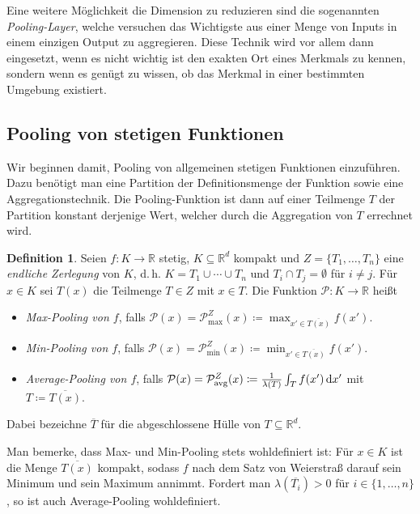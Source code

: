\documentclass[paper=a4, 	%
		fontsize=11pt,
		abstract=true, 	%
		headsepline, 	%
		notitlepage	%
		]{scrartcl}
\theoremstyle{definition}
\newtheorem{definition}[theorem]{Definition}
\newcommand{\R}{\mathbb{R}}
\newcommand{\diff}{\,\textrm{d}}
\newcommand{\avg}{\textnormal{avg}}
\begin{document}
Eine weitere Möglichkeit die Dimension zu reduzieren sind die sogenannten \emph{Pooling-Layer},
welche versuchen das Wichtigste aus einer Menge von Inputs in einem einzigen Output zu aggregieren.
Diese Technik wird vor allem dann eingesetzt, wenn es nicht wichtig ist den exakten Ort eines Merkmals zu kennen, sondern wenn es genügt zu wissen, ob das Merkmal in einer bestimmten Umgebung existiert.


\subsection{Pooling von stetigen Funktionen}

Wir beginnen damit, Pooling von allgemeinen stetigen Funktionen einzuführen.
Dazu benötigt man eine Partition der Definitionsmenge der Funktion sowie eine Aggregationstechnik.
Die Pooling-Funktion ist dann auf einer Teilmenge $T$ der Partition konstant derjenige Wert, welcher durch die Aggregation von $T$ errechnet wird. 

\begin{definition}
    Seien $f: K \rightarrow \R$ stetig, $K\subseteq \R^d$ kompakt und $Z=\{T_1,\dots, T_n\}$ eine \emph{endliche Zerlegung} von $K$, d.\,h. $K = T_1 \cup \cdots \cup T_n$ und $T_i \cap T_j = \emptyset$ für $i \neq j$.
    Für $x\in K$ sei $T(x)$ die Teilmenge $T\in Z$ mit $x\in T$.
    Die Funktion $\mathcal{P}: K\rightarrow \R$ heißt
    \begin{itemize}
        \item \emph{Max-Pooling von $f$}, falls $\mathcal{P}(x) = \mathcal{P}_{\max}^Z(x) \coloneqq \max_{x'\in \overline{T(x)}} f(x')$.
        \item \emph{Min-Pooling von $f$}, falls $\mathcal{P}(x) = \mathcal{P}_{\min}^Z(x) \coloneqq \min_{x'\in \overline{T(x)}} f(x')$.
        \item \emph{Average-Pooling von $f$}, falls $\mathcal{P}(x) = \mathcal{P}_{\avg}^Z(x) \coloneqq \frac{1}{\lambda(T)} \int_{T} f(x') \diff x'$ mit $T \coloneqq \overline{T(x)}$.
    \end{itemize}
    Dabei bezeichne $\overline{T}$ für die abgeschlossene Hülle von $T\subseteq \R^d$.
\end{definition}

Man bemerke, dass Max- und Min-Pooling stets wohldefiniert ist: Für $x\in K$ ist die Menge $\overline{T(x)}$ kompakt, sodass $f$ nach dem Satz von Weierstraß darauf sein Minimum und sein Maximum annimmt.
Fordert man $\lambda\left( \overline{T_i}\right) > 0$ für $i\in\{ 1, \dots, n\}$, so ist auch Average-Pooling wohldefiniert.
\end{document}
